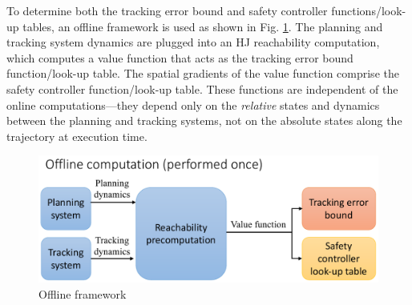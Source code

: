 To determine both the tracking error bound and safety controller functions/look-up tables, an offline framework is used as shown in Fig. \ref{fig:fw_offline}. The planning and tracking system dynamics are plugged into an HJ reachability computation, which computes a value function that acts as the tracking error bound function/look-up table. The spatial gradients of the value function comprise the safety controller function/look-up table. These functions are independent of the online computations---they depend only on the \textit{relative} states and dynamics between the planning and tracking systems, not on the absolute states along the trajectory at execution time.
\begin{figure}[h!]
  \centering
	\includegraphics[width=0.95\columnwidth]{fig/framework_offline}
	\caption{Offline framework}
	\label{fig:fw_offline}
\end{figure}

